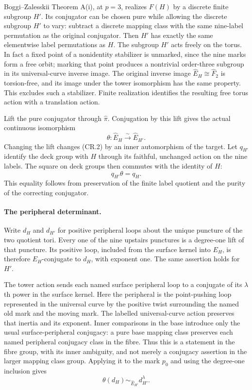 Boggi--Zalesskii Theorem A(i), at $p=3$, realizes $F(H)$ by a discrete
finite subgroup $H'$.  Its conjugator can be chosen pure while allowing
the discrete subgroup $H'$ to vary: subtract a discrete mapping class
with the same nine-label permutation as the original conjugator.
Then $H'$ has exactly the same elementwise label permutations as $H$.
The subgroup $H'$ acts freely on the torus.  In fact a fixed point of
a nonidentity stabilizer is unmarked, since the nine marks form a free
orbit; marking that point produces a nontrivial order-three subgroup
in its universal-curve inverse image.  The original inverse image
$\widehat E_H\cong\widehat F_2$ is torsion-free, and its image under
the tower isomorphism has the same property.  This excludes such a
stabilizer.  Finite realization identifies the resulting free torus
action with a translation action.

Lift the pure conjugator through $\widehat\pi$.  Conjugation by this
lift gives the actual continuous isomorphism
\[
 \theta:\widehat E_H\xrightarrow{\sim}\widehat E_{H'}.
                                                               \tag{CR.2}
\]
Changing the lift changes (CR.2) by an inner automorphism of the
target.  Let $q_{H'}$ identify the deck group with $H$ through its
faithful, unchanged action on the nine labels.  The square on deck
groups then commutes with the identity of $H$:
\[
                       q_{H'}\theta=q_H.                       \tag{CR.3}
\]
This equality follows from preservation of the finite label quotient
and the purity of the correcting conjugator.

\paragraph{The peripheral determinant.}
Write $d_H$ and $d_{H'}$ for positive peripheral loops about the unique
puncture of the two quotient tori.  Every one of the nine upstairs
punctures is a degree-one lift of that puncture.  Its positive loop,
included from the surface kernel into $E_H$, is therefore
$E_H$-conjugate to $d_H$, with exponent one.  The same assertion holds
for $H'$.

The tower action sends each named surface peripheral loop to a
conjugate of its $\lambda$th power in the surface kernel.  Here the
peripheral is the point-pushing loop represented in the universal
curve by the positive twist surrounding the named old mark and the
moving mark.  The labelled universal-curve action preserves that
inertia and its exponent.  Inner comparisons in the base introduce
only the usual surface-peripheral conjugacy: a pure base mapping
class preserves each named peripheral conjugacy class in the fibre.
Thus this is a statement in the fibre group, with its inner ambiguity,
and not merely a conjugacy assertion in the larger mapping class
group.  Applying it to the mark $p_0$ and using the degree-one
inclusion gives
\[
                  \theta(d_H)\sim_{\widehat E_{H'}}
                                     d_{H'}^{\lambda}.           \tag{CR.4}
\]

